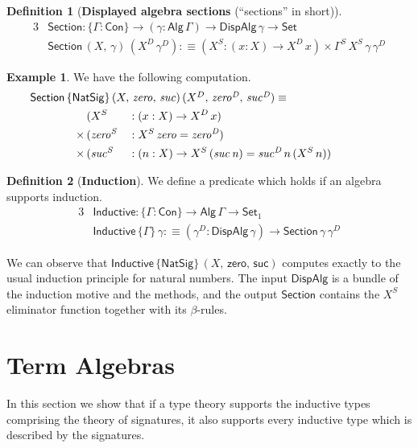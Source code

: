 \documentclass[12pt,a4paper,twoside,openany]{book}
\theoremstyle{remark}
\theoremstyle{definition}
\newtheorem{mydefinition}{Definition}
\newtheorem{myexample}{Example}
\theoremstyle{theorem}
\newcommand{\mi}[1]{\mathit{#1}}
\newcommand{\ms}[1]{\mathsf{#1}}
\newcommand{\Con}{\mathsf{Con}}
\newcommand{\Set}{\mathsf{Set}}
\newcommand{\Alg}{\ms{Alg}}
\newcommand{\DispAlg}{\ms{DispAlg}}
\newcommand{\Section}{\ms{Section}}
\newcommand{\Inductive}{\ms{Inductive}}
\newcommand{\defn}{:\equiv}
\begin{document}
\begin{mydefinition}[\textbf{Displayed algebra sections} (``sections'' in short)]
\begin{alignat*}{3}
  & \Section : \{\Gamma : \Con\} \to (\gamma : \Alg\,\Gamma) \to \DispAlg\,\gamma \to \Set\\
  & \Section\,(X,\,\gamma)\,(X^D\,\gamma^D) \defn (X^S : (x : X) \to X^D\,x) \times \Gamma^S\,X^S\,\gamma\,\gamma^D
\end{alignat*}
\end{mydefinition}
\begin{myexample} We have the following computation.
\begin{alignat*}{3}
  & \hspace{-5em}\rlap{$\Section\,\{\ms{NatSig}\}\,(X,\,\mi{zero},\,\mi{suc})\,(X^D,\,\mi{zero^D},\,\mi{suc^D}) \equiv$}\\
              & (X^S &&: (x : X) \to X^D\,x)\\
      \times\,& (\mi{zero^S} &&: X^S\,\mi{zero} = \mi{zero^D})\\
      \times\,& (\mi{suc^S} &&: (n : X) \to X^S\,(\mi{suc\,n}) = \mi{suc^D}\,n\,(X^S\,n))
\end{alignat*}
\end{myexample}

\begin{mydefinition}[\textbf{Induction}]
We define a predicate which holds if an algebra supports induction.
\begin{alignat*}{3}
  & \Inductive : \{\Gamma : \Con\} \to \Alg\,\Gamma \to \Set_1\\
  & \Inductive\,\{\Gamma\}\,\gamma \defn
     (\gamma^D : \DispAlg\,\gamma) \to \Section\,\gamma\,\gamma^D
\end{alignat*}
\end{mydefinition}

We can observe that $\Inductive\,\{\ms{NatSig}\}\,(X,\,\ms{zero},\,\ms{suc})$
computes exactly to the usual induction principle for natural numbers. The input
$\DispAlg$ is a bundle of the induction motive and the methods, and the output
$\Section$ contains the $X^S$ eliminator function together with its
$\beta$-rules.

\section{Term Algebras}

In this section we show that if a type theory supports the inductive types comprising
the theory of signatures, it also supports every inductive type which is described
by the signatures.
\end{document}
